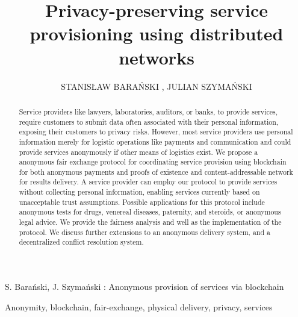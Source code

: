 \documentclass{ieeeaccess}
\begin{document}

\title{Privacy-preserving service provisioning using distributed networks}
\author{\uppercase{Stanis\l{}aw Bara{\'n}ski} ,
\uppercase{Julian Szyma{\'n}ski } 
 }

\address[1]{Department of Electronic, Telecommunication and Informatics, Gdansk University of Technology, Narutowicza 11/12 Gdansk Poland (e-mail: stanislaw.baranski@pg.edu.pl, julian.szymanski@eti.pg.edu.pl}

 


{S. Bara{\'n}ski, J. Szyma{\'n}ski : 
Anonymous provision of services via blockchain}


\begin{abstract}
Service providers like lawyers, laboratories, auditors, or banks, to provide services, require customers to submit data often associated with their personal information, exposing their customers to privacy risks. However, most service providers use personal information merely for logistic operations like payments and communication and could provide services anonymously if other means of logistics exist.
We propose a anonymous fair exchange protocol for coordinating service provision using blockchain for both anonymous payments and proofs of existence and content-addressable network for results delivery.
A service provider can employ our protocol to provide services without collecting personal information, enabling services currently based on unacceptable trust assumptions. 
Possible applications for this protocol include anonymous tests for drugs, venereal diseases, paternity, and steroids, or anonymous legal advice.
We provide the fairness analysis and well as the implementation of the protocol. We discuss further extensions to an anonymous delivery system, and a decentralized conflict resolution system.
\end{abstract}

\begin{keywords}
Anonymity, blockchain, fair-exchange, physical delivery, privacy, services
\end{keywords}
\end{document}
